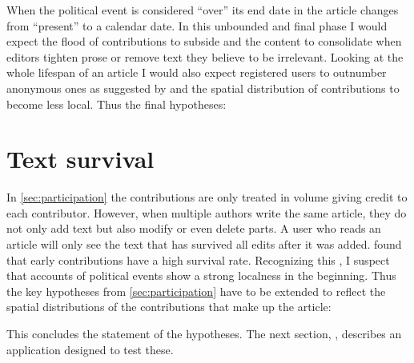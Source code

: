 When the political event is considered ``over'' its end date in the article changes from ``present'' to a calendar date.
In this unbounded and final phase I would expect the flood of contributions to subside and the content to consolidate when editors tighten prose or remove text they believe to be irrelevant.
Looking at the whole lifespan of an article I would also expect registered users to outnumber anonymous ones as suggested by \textcite{kittur2007power} and the spatial distribution of contributions to become less local.
Thus the final hypotheses:





\section{Text survival}\label{sec:textsurvival}

In \ref{sec:participation} the contributions are only treated in volume giving credit to each contributor.
However, when multiple authors write the same article, they do not only add text but also modify or even delete parts.
A user who reads an article will only see the text that has survived all edits after it was added.
\textcite{viegas2004history} found that early contributions have a high survival rate.
Recognizing this , I suspect that accounts of political events show a strong localness in the beginning.
Thus the key hypotheses from \ref{sec:participation} have to be extended to reflect the spatial distributions of the contributions that make up the article:



This concludes the statement of the hypotheses.
The next section, , describes an application designed to test these.